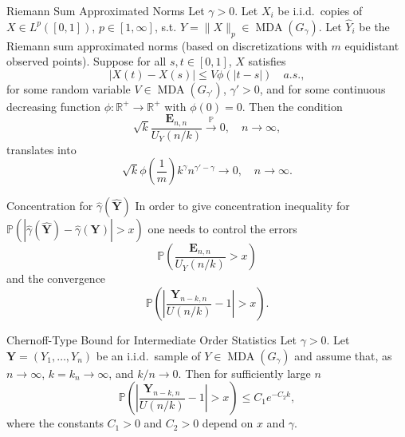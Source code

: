 \documentclass[11pt, aspectratio=169]{beamer}
\DeclareMathOperator{\mda}{MDA}
\begin{document}
\begin{frame}{Riemann Sum Approximated Norms}
  Let $\gamma > 0$. Let $X_i$ be i.i.d.\ copies of $X\in L^p\left([0,1]\right)$,
  $p\in [1,\infty]$, s.t. $Y = \|X\|_p\in\mda\left(G_\gamma\right)$. Let $\hat
  Y_i$ be the Riemann sum approximated norms (based on discretizations with $m$
  equidistant observed points). Suppose for all $s,t\in [0,1]$, $X$ satisfies
  \begin{equation*}
    \left|X(t) - X(s)\right| \leq V\phi\left(|t-s|\right) \quad a.s.,
  \end{equation*}
  for some random variable $V\in\mda\left(G_{\gamma'}\right)$, $\gamma' > 0$,
  and for some continuous decreasing function $\phi:\mathbb{R}^+\to
  \mathbb{R}^+$ with $\phi\left(0\right) = 0$. Then the condition
  \begin{equation*}
    \sqrt{k}\frac{\bm E_{n,n}}{U_Y\left(n/k\right)}\stackrel{\mathbb{P}}{\to}0,
    \quad n\to\infty,
  \end{equation*}
  translates into
  \begin{equation*}
    \sqrt{k}\phi\left(\frac{1}{m}\right)k^\gamma n^{\gamma' - \gamma}\to 0,
    \quad n\to\infty.
  \end{equation*}
\end{frame}


\begin{frame}{Concentration for $\hat\gamma(\hat{\bm Y})$} In order to give
  concentration inequality for $\mathbb{P}\left(\left|\hat\gamma(\hat{\bm Y}) -
  \hat\gamma(\bm Y)\right| > x\right)$ one needs to control the errors
  \begin{equation*}
    \mathbb{P}\left(\frac{\bm E_{n,n}}{U_Y\left(n/k\right)} > x\right)
  \end{equation*}
  and the convergence
  \begin{equation*}
    \mathbb{P}\left(\left|\frac{\bm
    Y_{n-k,n}}{U(n/k)} - 1\right| > x\right).
  \end{equation*}
\end{frame}


\begin{frame}{Chernoff-Type Bound for Intermediate Order Statistics}
  Let $\gamma > 0$. Let $\bm Y = \left(Y_1, \ldots, Y_n\right)$ be an i.i.d.\
  sample of $Y\in\mda\left(G_\gamma\right)$ and assume that, as $n\to\infty$,
  $k=k_n\to\infty$, and $k/n\to 0$. Then for sufficiently large $n$
  \begin{equation*}
    \mathbb{P}\left(\left|\frac{\bm
    Y_{n-k,n}}{U(n/k)} - 1\right| > x\right)
    \leq C_1 e^{-C_2 k},
  \end{equation*} 
  where the constants $C_1 > 0$ and $C_2 > 0$ depend on $x$ and $\gamma$.
\end{frame}
\end{document}
